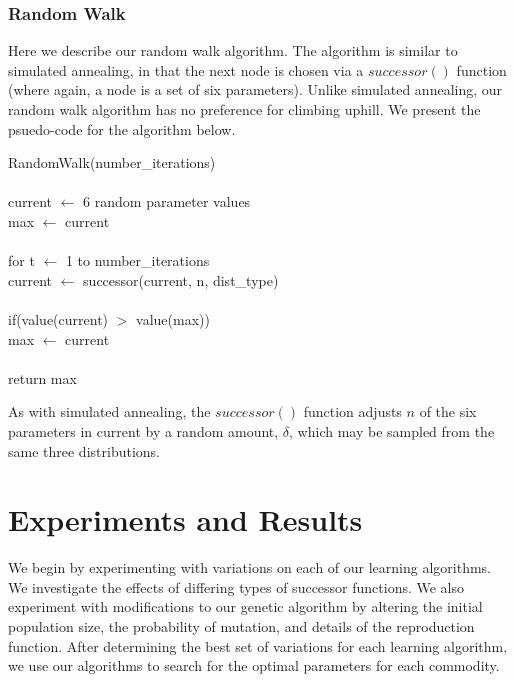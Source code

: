 \documentclass[12pt]{article}
\begin{document}
\subsubsection{Random Walk}

Here we describe our random walk algorithm.  The algorithm is similar to
simulated annealing, in that the next node is chosen via a $successor()$
function (where again, a node is a set of six parameters). Unlike simulated
annealing, our random walk algorithm has no preference for climbing uphill. We
present the psuedo-code for the algorithm below.

\vspace{10pt}
\setlength{\parindent}{5mm}
\indent RandomWalk(number\_iterations)\\\\
\indent \indent current $\leftarrow$ 6 random parameter values\\
\indent \indent max $\leftarrow$ current\\\\
\indent \indent for t $\leftarrow$ 1 to number\_iterations\\
\indent \indent \indent current $\leftarrow$ successor(current, n, dist\_type)\\\\
\indent \indent \indent if(value(current) $>$ value(max))\\
\indent \indent \indent \indent max $\leftarrow$ current\\\\
\indent \indent return max\\
\setlength{\parindent}{0mm}

As with simulated annealing, the $successor()$ function adjusts $n$ of the six
parameters in current by a random amount, $\delta$, which may be sampled from
the same three distributions.

\section{Experiments and Results}

We begin by experimenting with variations on each of our learning algorithms. We
investigate the effects of differing types of successor functions. We also
experiment with modifications to our genetic algorithm by altering the initial
population size, the probability of mutation, and details of the reproduction
function. After determining the best set of variations for each learning
algorithm, we use our algorithms to search for the optimal parameters for
each commodity.
\end{document}
